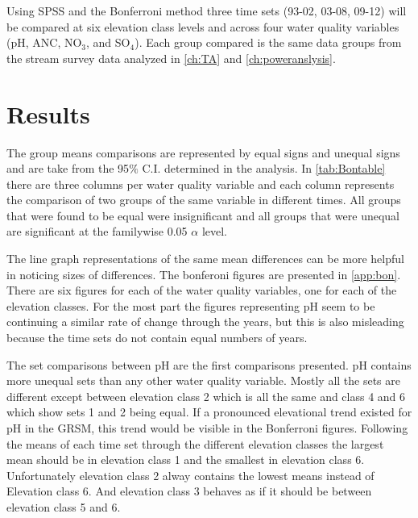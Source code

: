 Using SPSS and the Bonferroni method three time sets (93-02, 03-08, 09-12) will be compared at six elevation class levels and across four water quality variables (pH, ANC, NO$_3$, and SO$_4 $).
Each group compared is the same data groups from the stream survey data analyzed in \autoref{ch:TA} and \autoref{ch:poweranslysis}.

\section{Results}%


The group means comparisons are represented by equal signs and unequal signs and are take from the 95$\%$ C.I. determined in the analysis.
In \autoref{tab:Bontable} there are three columns per water quality variable and each column represents the comparison of two groups of the same variable in different times.
All groups that were found to be equal were insignificant and all groups that were unequal are significant at the familywise 0.05 $\alpha$ level.

The line graph representations of the same mean differences can be more helpful in noticing sizes of differences.%
The bonferoni figures are presented in \autoref{app:bon}.
There are six figures for each of the water quality variables, one for each of the elevation classes.
For the most part the figures representing pH seem to be continuing a similar rate of change through the years, but this is also misleading because the time sets do not contain equal numbers of years.

The set comparisons between pH are the first comparisons presented.  
pH contains more unequal sets than any other water quality variable.
Mostly all the sets are different except between elevation class 2 which is all the same and class 4 and 6 which show sets 1 and 2 being equal.  
If a pronounced elevational trend existed for pH in the GRSM, this trend would be visible in the Bonferroni figures.
Following the means of each time set through the different elevation classes the largest mean should be in elevation class 1 and the smallest in elevation class 6.
Unfortunately elevation class 2 alway contains the lowest means instead of Elevation class 6.
And elevation class 3 behaves as if it should be between elevation class 5 and 6.

